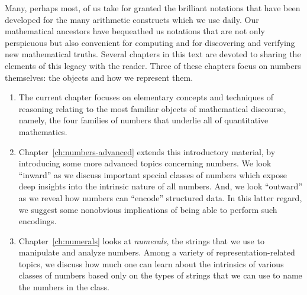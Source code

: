 Many, perhaps most, of us take for granted the brilliant notations that have been developed for the many arithmetic constructs which we use daily.  Our mathematical ancestors have bequeathed us notations that are not only perspicuous but also convenient for computing and for discovering and verifying new mathematical truths.  Several chapters in this text are devoted to sharing the elements of this legacy with the reader.  Three of these chapters focus on numbers themselves: the objects and how we represent them.
\begin{enumerate}
\item
The current chapter focuses on elementary concepts and techniques of reasoning relating to the most familiar objects of mathematical discourse, namely, the four families of numbers that underlie all of quantitative mathematics.
\medskip\item
Chapter~\ref{ch:numbers-advanced} extends this introductory material, by introducing some more advanced topics concerning numbers.  We look ``inward'' as we discuss important special classes of numbers which expose deep insights into the intrinsic nature of all numbers.  And, we
look ``outward'' as we reveal how numbers can ``encode'' structured data.  In this latter regard, we suggest some nonobvious implications of being able to perform such encodings.
\medskip\item
Chapter~\ref{ch:numerals} looks at {\it numerals}, the strings that we use to manipulate and analyze numbers.  Among a variety of representation-related topics, we discuss how much one can learn about the intrinsics of various classes of numbers based only on the types of strings that we can use to name the numbers in the class.
\end{enumerate}
  

\medskip


